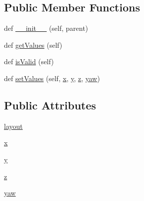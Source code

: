 \subsection*{Public Member Functions}
\begin{DoxyCompactItemize}
\item 
def \mbox{\hyperlink{classwindshape_1_1gui_1_1widgets_1_1tabs_1_1_setpoint_widget_1_1_setpoint_widget_a8c16d27f1dfd85ea38abce52e87bd980}{\+\_\+\+\_\+init\+\_\+\+\_\+}} (self, parent)
\item 
def \mbox{\hyperlink{classwindshape_1_1gui_1_1widgets_1_1tabs_1_1_setpoint_widget_1_1_setpoint_widget_a93bfd2c10c320071ea37ff41e977378f}{get\+Values}} (self)
\item 
def \mbox{\hyperlink{classwindshape_1_1gui_1_1widgets_1_1tabs_1_1_setpoint_widget_1_1_setpoint_widget_a0131b6f0bc2dcdba88c8b0b6053d7489}{is\+Valid}} (self)
\item 
def \mbox{\hyperlink{classwindshape_1_1gui_1_1widgets_1_1tabs_1_1_setpoint_widget_1_1_setpoint_widget_a2a9b2bdebfd55b54751e48530af7df07}{set\+Values}} (self, \mbox{\hyperlink{classwindshape_1_1gui_1_1widgets_1_1tabs_1_1_setpoint_widget_1_1_setpoint_widget_ad86c8acb5cf94f715f5f1a9a1c2372c6}{x}}, \mbox{\hyperlink{classwindshape_1_1gui_1_1widgets_1_1tabs_1_1_setpoint_widget_1_1_setpoint_widget_a3f0e13466e05d1f472aafd30a3caa8ed}{y}}, \mbox{\hyperlink{classwindshape_1_1gui_1_1widgets_1_1tabs_1_1_setpoint_widget_1_1_setpoint_widget_aea842061d89057ea6c76fd89ef29c571}{z}}, \mbox{\hyperlink{classwindshape_1_1gui_1_1widgets_1_1tabs_1_1_setpoint_widget_1_1_setpoint_widget_aa198e45e941468ed397083b964833be2}{yaw}})
\end{DoxyCompactItemize}
\subsection*{Public Attributes}
\begin{DoxyCompactItemize}
\item 
\mbox{\hyperlink{classwindshape_1_1gui_1_1widgets_1_1tabs_1_1_setpoint_widget_1_1_setpoint_widget_ac6bc61775c3b71561ce622aa50a7fbe9}{layout}}
\item 
\mbox{\hyperlink{classwindshape_1_1gui_1_1widgets_1_1tabs_1_1_setpoint_widget_1_1_setpoint_widget_ad86c8acb5cf94f715f5f1a9a1c2372c6}{x}}
\item 
\mbox{\hyperlink{classwindshape_1_1gui_1_1widgets_1_1tabs_1_1_setpoint_widget_1_1_setpoint_widget_a3f0e13466e05d1f472aafd30a3caa8ed}{y}}
\item 
\mbox{\hyperlink{classwindshape_1_1gui_1_1widgets_1_1tabs_1_1_setpoint_widget_1_1_setpoint_widget_aea842061d89057ea6c76fd89ef29c571}{z}}
\item 
\mbox{\hyperlink{classwindshape_1_1gui_1_1widgets_1_1tabs_1_1_setpoint_widget_1_1_setpoint_widget_aa198e45e941468ed397083b964833be2}{yaw}}
\end{DoxyCompactItemize}
